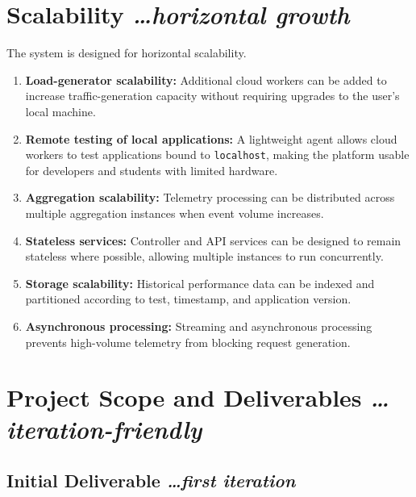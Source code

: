 \documentclass[11pt,a4paper]{article}
\newcommand{\BvrHint}[1]{%
  {\normalfont\normalsize\itshape\hfill #1}}
\begin{document}
\section{Scalability%
  \BvrHint{\ldots horizontal growth}}

The system is designed for horizontal scalability.

\begin{enumerate}[leftmargin=0.7cm]

    \item \textbf{Load-generator scalability:} Additional cloud
    workers can be added to increase traffic-generation capacity
    without requiring upgrades to the user's local machine.

    \item \textbf{Remote testing of local applications:} A lightweight
    agent allows cloud workers to test applications bound to
    \texttt{localhost}, making the platform usable for developers and
    students with limited hardware.

    \item \textbf{Aggregation scalability:} Telemetry processing can
    be distributed across multiple aggregation instances when event
    volume increases.

    \item \textbf{Stateless services:} Controller and API services can
    be designed to remain stateless where possible, allowing multiple
    instances to run concurrently.

    \item \textbf{Storage scalability:} Historical performance data
    can be indexed and partitioned according to test, timestamp, and
    application version.

    \item \textbf{Asynchronous processing:} Streaming and asynchronous
    processing prevents high-volume telemetry from blocking request
    generation.

\end{enumerate}

\section{Project Scope and Deliverables%
  \BvrHint{\ldots iteration-friendly}}

\subsection{Initial Deliverable%
  \BvrHint{\ldots first iteration}}
\end{document}
